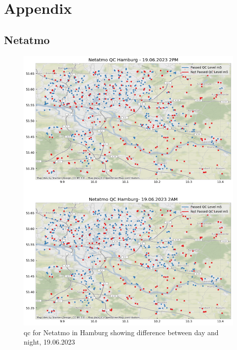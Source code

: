 \chapter{Appendix}

\section{Netatmo}
\label{appendix: netatmo}

\begin{figure}[ht]
    \centering
    \includegraphics[width=.8\textwidth]{images/qc_hamburg_netatmo_june_before_after.png}
    \caption{\gls{qc} for Netatmo in Hamburg showing difference between day and night, 19.06.2023}
    \label{fig:qc netatmo hamburg before after m5}
\end{figure}

